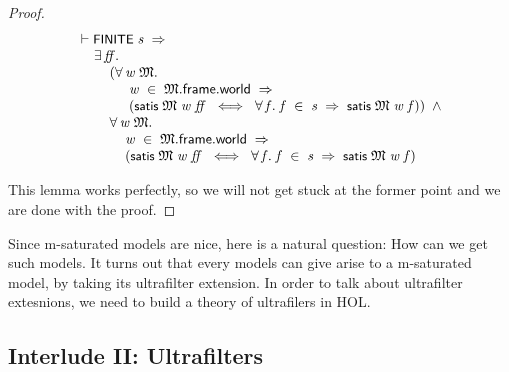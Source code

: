 \documentclass[letterpaper]{article}
\renewcommand{\HOLConst}[1]{{\textsf{\upshape\small #1}}}
\newenvironment{holmath}{\begin{displaymath}\begin{array}{l}}{\end{array}\end{displaymath}\ignorespacesafterend}
\begin{document}
\begin{proof}
\begin{holmath}
  \ensuremath{\HOLTokenTurnstile}\HOLConst{FINITE}\;\HOLFreeVar{s}\;\HOLSymConst{\HOLTokenImp{}}\\
\;\;\;\;\;\HOLSymConst{\HOLTokenExists{}}\HOLBoundVar{ff}.\\
\;\;\;\;\;\;\;\;\;(\HOLSymConst{\HOLTokenForall{}}\HOLBoundVar{w}\;\HOLBoundVar{\ensuremath{\mathfrak{M}}}.\\
\;\;\;\;\;\;\;\;\;\;\;\;\;\;\HOLBoundVar{w}\;\HOLSymConst{\HOLTokenIn{}}\;\HOLBoundVar{\ensuremath{\mathfrak{M}}}.\HOLFieldName{frame}.\HOLFieldName{world}\;\HOLSymConst{\HOLTokenImp{}}\\
\;\;\;\;\;\;\;\;\;\;\;\;\;\;(\HOLConst{satis}\;\HOLBoundVar{\ensuremath{\mathfrak{M}}}\;\HOLBoundVar{w}\;\HOLBoundVar{ff}\;\HOLSymConst{\HOLTokenEquiv{}}\;\HOLSymConst{\HOLTokenForall{}}\HOLBoundVar{f}.\;\HOLBoundVar{f}\;\HOLSymConst{\HOLTokenIn{}}\;\HOLFreeVar{s}\;\HOLSymConst{\HOLTokenImp{}}\;\HOLConst{satis}\;\HOLBoundVar{\ensuremath{\mathfrak{M}}}\;\HOLBoundVar{w}\;\HOLBoundVar{f}))\;\HOLSymConst{\HOLTokenConj{}}\\
\;\;\;\;\;\;\;\;\;\HOLSymConst{\HOLTokenForall{}}\HOLBoundVar{w}\;\HOLBoundVar{\ensuremath{\mathfrak{M}}}.\\
\;\;\;\;\;\;\;\;\;\;\;\;\;\HOLBoundVar{w}\;\HOLSymConst{\HOLTokenIn{}}\;\HOLBoundVar{\ensuremath{\mathfrak{M}}}.\HOLFieldName{frame}.\HOLFieldName{world}\;\HOLSymConst{\HOLTokenImp{}}\\
\;\;\;\;\;\;\;\;\;\;\;\;\;(\HOLConst{satis}\;\HOLBoundVar{\ensuremath{\mathfrak{M}}}\;\HOLBoundVar{w}\;\HOLBoundVar{ff}\;\HOLSymConst{\HOLTokenEquiv{}}\;\HOLSymConst{\HOLTokenForall{}}\HOLBoundVar{f}.\;\HOLBoundVar{f}\;\HOLSymConst{\HOLTokenIn{}}\;\HOLFreeVar{s}\;\HOLSymConst{\HOLTokenImp{}}\;\HOLConst{satis}\;\HOLBoundVar{\ensuremath{\mathfrak{M}}}\;\HOLBoundVar{w}\;\HOLBoundVar{f})
\end{holmath}

This lemma works perfectly, so we will not get stuck at the former point and we are done with the proof.
\end{proof}

Since m-saturated models are nice, here is a natural question: How can we get such models. It turns out that every models can give arise to a m-saturated model, by taking its ultrafilter extension. In order to talk about ultrafilter extesnions, we need to build a theory of ultrafilers in HOL.

\subsection{Interlude II: Ultrafilters}
\end{document}
